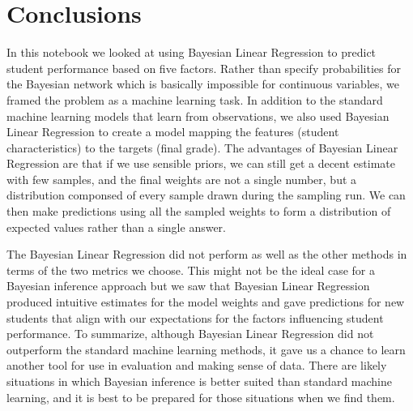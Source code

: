 \documentclass[12pt]{article}
\begin{document}
    \hypertarget{conclusions}{%
\section{Conclusions}\label{conclusions}}

In this notebook we looked at using Bayesian Linear Regression to
predict student performance based on five factors. Rather than specify
probabilities for the Bayesian network which is basically impossible for
continuous variables, we framed the problem as a machine learning task.
In addition to the standard machine learning models that learn from
observations, we also used Bayesian Linear Regression to create a model
mapping the features (student characteristics) to the targets (final
grade). The advantages of Bayesian Linear Regression are that if we use
sensible priors, we can still get a decent estimate with few samples,
and the final weights are not a single number, but a distribution
componsed of every sample drawn during the sampling run. We can then
make predictions using all the sampled weights to form a distribution of
expected values rather than a single answer.

The Bayesian Linear Regression did not perform as well as the other
methods in terms of the two metrics we choose. This might not be the
ideal case for a Bayesian inference approach but we saw that Bayesian
Linear Regression produced intuitive estimates for the model weights and
gave predictions for new students that align with our expectations for
the factors influencing student performance. To summarize, although
Bayesian Linear Regression did not outperform the standard machine
learning methods, it gave us a chance to learn another tool for use in
evaluation and making sense of data. There are likely situations in
which Bayesian inference is better suited than standard machine
learning, and it is best to be prepared for those situations when we
find them.


    
    
    
    
\end{document}

